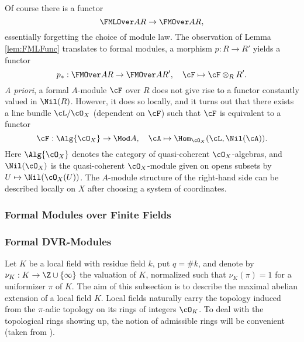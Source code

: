 \documentclass[../main.tex]{subfiles}
\begin{document}
Of course there is a functor 
\begin{equation*}
  \FMLOver AR \to \FMOver AR,
\end{equation*}
essentially forgetting the choice of module law. The observation of Lemma 
\ref{lem:FMLFunc} translates to formal modules, a morphism $p : R \to R'$ 
yields a functor 
\begin{equation*}
  p_*: \FMOver AR \to \FMOver A{R'}, \quad \cF \mapsto \cF \otimes_R R'.
\end{equation*}
\textit{A priori}, a formal $A$-module $\cF$ over $R$ does not give rise to a
functor constantly valued in $\Nil(R)$. However, it does so locally, 
and it turns out that there exists a line bundle $\cL/\cO_X$ (dependent on $\cF$)
such that $\cF$ is equivalent to a functor
\begin{equation*}
  \cF: \Alg {\cO_X} \to \Mod A, \quad \cA \mapsto \Hom_{\cO_X}(\cL,
  \Nil(\cA)).
\end{equation*}
Here $\Alg {\cO_X}$ denotes the category of quasi-coherent $\cO_X$-algebras,
and $\Nil(\cO_X)$ is the quasi-coherent $\cO_X$-module given on 
opens subsets by $U \mapsto \Nil(\cO_X(U))$. The $A$-module structure 
of the right-hand side can be described locally on $X$ after choosing 
a system of coordinates.

\subsubsection{Formal Modules over Finite Fields}

\subsubsection{Formal DVR-Modules}
Let $K$ be a local field with residue field $k$, put $q = \# k$, and 
denote by $\nu_K: K \to \Z \cup \{\infty\}$ the valuation of $K$, normalized
such that $\nu_K(\pi) = 1$ for a uniformizer $\pi$ of $K$.
The aim of this subsection is to describe the maximal abelian extension of
a local field $K$.
Local fields naturally carry the topology induced from the $\pi$-adic 
topology on its rings of integers $\cO_K$. To deal with the topological 
rings showing up, the notion of admissible rings will be convenient (taken from
\cite[Tag 07E8]{stacks-project}).
\end{document}
